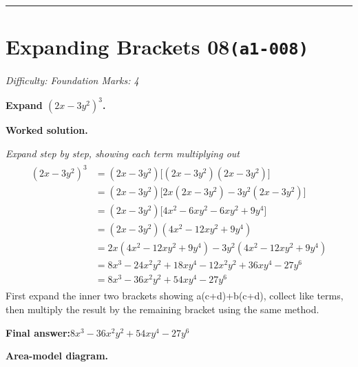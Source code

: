 \documentclass[11pt]{article}
\newcommand{\question}[1]{\par\medskip\noindent\textbf{#1}\par}
\begin{document}
\medskip\hrule

\section*{Expanding Brackets 08\quad\small\texttt{(a1-008)}}
\textit{Difficulty: Foundation \quad\textbar\quad Marks: 4}

\question{Expand \(  (2x-3y^2)^3 \).}

\textbf{Worked solution.}

\textit{Expand step by step, showing each term multiplying out}
\[\begin{gathered}
\begin{aligned} (2x-3y^2)^3 &= (2x-3y^2)\Big[(2x-3y^2)(2x-3y^2)\Big] \\ &= (2x-3y^2)\Big[2x(2x-3y^2)-3y^2(2x-3y^2)\Big] \\ &= (2x-3y^2)\Big[4x^2-6xy^2-6xy^2+9y^4\Big] \\ &= (2x-3y^2)(4x^2-12xy^2+9y^4) \\ &= 2x(4x^2-12xy^2+9y^4)-3y^2(4x^2-12xy^2+9y^4) \\ &= 8x^3-24x^2y^2+18xy^4-12x^2y^2+36xy^4-27y^6 \\ &= 8x^3-36x^2y^2+54xy^4-27y^6 \end{aligned}
\end{gathered}\]
First expand the inner two brackets showing a(c+d)+b(c+d), collect like terms, then multiply the result by the remaining bracket using the same method.

\begin{answerbox}
\textbf{Final answer:}\quad \(\displaystyle 8x^3-36x^2y^2+54xy^4-27y^6\)
\end{answerbox}
\textbf{Area-model diagram.}
\end{document}
